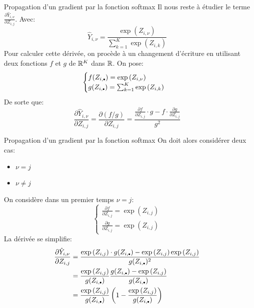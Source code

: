 \begin{frame}{Propagation d'un gradient par la fonction softmax}
	Il nous reste à étudier le terme $\frac{\partial{\hat{Y}_{i,\nu}}}{\partial{Z_{i,j}}}$. Avec:
	\begin{equation*}
		\hat{Y}_{i,\nu} = \frac{\exp{(Z_{i,\nu})}}{\sum_{k=1}^K \exp{(Z_{i,k})}}
	\end{equation*}
	\pause
	Pour calculer cette dérivée, on procède à un changement d'écriture en utilisant deux fonctions $f$ et $g$ de $\mathbb{R}^K$ dans $\mathbb{R}$. On pose:
	\begin{equation*}
		\begin{cases}
			f(Z_{i,\bigdot}) = \exp{(Z_{i,\nu})} \\
			g(Z_{i,\bigdot}) = \sum_{k=1}^K \exp{(Z_{i,k})}
		\end{cases}
	\end{equation*}
	\pause
	De sorte que:
	\begin{equation*}
		\frac{\partial{\hat{Y}_{i,\nu}}}{\partial{Z_{i,j}}} = \frac{\partial{(f / g)}}{\partial{Z_{i,j}}} =  \frac{\frac{\partial{f}}{\partial{Z_{i,j}}} \cdot g - f \cdot \frac{\partial{g}}{\partial{Z_{i,j}}}}{g^2}
	\end{equation*}
\end{frame}

\begin{frame}{Propagation d'un gradient par la fonction softmax}
	On doit alors considérer deux cas:
	\begin{itemize}
		\item $\nu = j$
		\item $\nu \ne j$
	\end{itemize}
	\pause
	On considère dans un premier temps $\nu = j$:
	\begin{equation*}
		\begin{cases}
			\frac{\partial{f}}{\partial{Z_{i,j}}} = \exp{(Z_{i,j})} \\
			\frac{\partial{g}}{\partial{Z_{i,j}}} = \exp{(Z_{i,j})}
		\end{cases}
	\end{equation*}
	\pause
	La dérivée se simplifie:
	\begin{equation*}
		\begin{aligned}
			\frac{\partial{\hat{Y}_{i,\nu}}}{\partial{Z_{i,j}}}
			&= \frac{\exp{(Z_{i,j})} \cdot g(Z_{i,\bigdot}) - \exp{(Z_{i,j})} \exp{(Z_{i,j})}}{g(Z_{i,\bigdot})^2} \\
			&= \frac{\exp{(Z_{i,j})}}{g(Z_{i,\bigdot})} \frac{g(Z_{i,\bigdot}) - \exp{(Z_{i,j})}}{g(Z_{i,\bigdot})} \\
			&= \frac{\exp{(Z_{i,j})}}{g(Z_{i,\bigdot})} \left(1 - \frac{\exp{(Z_{i,j})}}{g(Z_{i,\bigdot})}\right)
		\end{aligned}
	\end{equation*}
\end{frame}

